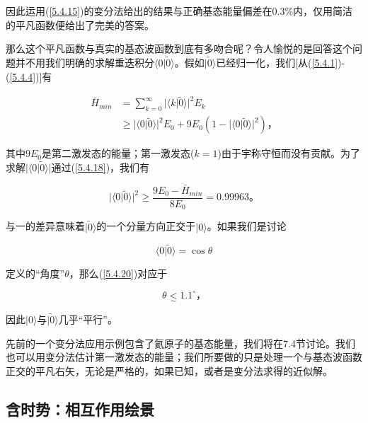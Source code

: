 ﻿\documentclass[UTF8,twoside]{ctexart}
\begin{document}
\noindent 因此运用(\ref{5.4.15})的变分法给出的结果与正确基态能量偏差在$0.3\%$内，仅用简洁的平凡函数便给出了完美的答案。

那么这个平凡函数与真实的基态波函数到底有多吻合呢？令人愉悦的是回答这个问题并不用我们明确的求解重迭积分$\langle0|\tilde{0}\rangle$。假如$|\tilde{0}\rangle$已经归一化，我们[从(\ref{5.4.1})-(\ref{5.4.4})]有

\begin{equation} \label{5.4.19}
\begin{split}
\bar{H}_{min}&=\displaystyle\sum_{k=0}^{\infty}|\langle k|\tilde{0}\rangle|^2E_k\\
&\geq|\langle0|\tilde{0}\rangle|^2E_0+9E_0(1-|\langle0|\tilde{0}\rangle|^2)\text{，}
\end{split}
\end{equation}

\noindent 其中$9E_0$是第二激发态的能量；第一激发态($k=1$)由于宇称守恒而没有贡献。为了求解$|\langle0|\tilde{0}\rangle|$通过(\ref{5.4.18})，我们有

\begin{equation} \label{5.4.20}
|\langle0|\tilde{0}\rangle|^2\geq\dfrac{9E_0-\bar{H}_{min}}{8E_0}=0.99963\text{。}
\end{equation}

\noindent 与一的差异意味着$|\tilde{0}\rangle$的一个分量方向正交于$|0\rangle$。如果我们是讨论

\begin{equation} \label{5.4.21}
\langle0|\tilde{0}\rangle=\cos\theta
\end{equation}

\noindent 定义的“角度”$\theta$，那么(\ref{5.4.20})对应于

\begin{equation} \label{5.4.22}
\theta\underset{\sim}{<}1.1^{\circ}\text{，}
\end{equation}

\noindent 因此$|0\rangle$与$|\tilde{0}\rangle$几乎“平行”。

先前的一个变分法应用示例包含了氦原子的基态能量，我们将在7.4节讨论。我们也可以用变分法估计第一激发态的能量；我们所要做的只是处理一个与基态波函数正交的平凡右矢，无论是严格的，如果已知，或者是变分法求得的近似解。

\subsection{含时势：相互作用绘景}

\
\end{document}
